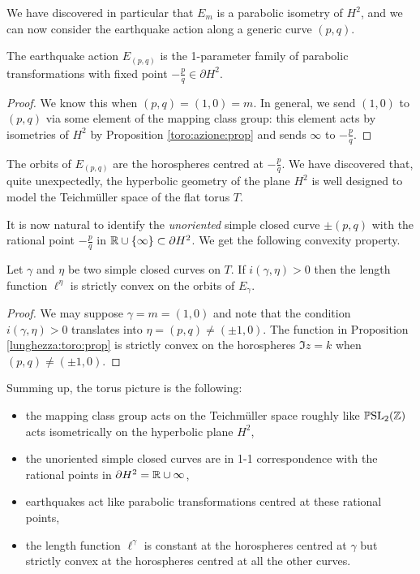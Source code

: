 We have discovered in particular that $E_m$ is a parabolic isometry of $H^2$, and we can now consider the earthquake action along a generic curve $(p,q)$.

\begin{cor} 
The earthquake action $E_{(p,q)}$ is the 1-parameter family of parabolic transformations with fixed point $-\frac pq \in \partial H^2$. 
\end{cor}
\begin{proof}
We know this when $(p,q)=(1,0)=m$. In general, we send $(1,0)$ to $(p,q)$ via some element of the mapping class group: this element acts by isometries of $H^2$ by Proposition \ref{toro:azione:prop} and sends $\infty$ to $-\frac pq$. 
\end{proof}

The orbits of $E_{(p,q)}$ are the horospheres centred at $-\frac pq$. 
We have discovered that, quite unexpectedly, the hyperbolic geometry of the plane $H^2$ is well designed to model the Teichm\"uller space of the flat torus $T$. 

It is now natural to identify the \emph{unoriented} simple closed curve $\pm (p,q)$ with the rational point $-\frac pq$ in $\mathbb{R}\cup\{\infty\} \subset \partial H^2$. We get the following convexity property.

\begin{cor} \label{convex:cor}
Let $\gamma$ and $\eta$ be two simple closed curves on $T$.
If $i(\gamma, \eta)>0$ then the length function $\ell^\eta$ is strictly convex on the orbits of $E_{\gamma}$.
\end{cor}
\begin{proof}
We may suppose $\gamma=m=(1,0)$ and note that the condition $i(\gamma,\eta)>0$ translates into $\eta = (p,q) \neq (\pm 1,0)$. The function in Proposition \ref{lunghezza:toro:prop} is strictly convex on the horospheres $\Im z = k$ when $(p,q)\neq (\pm 1,0)$.
\end{proof}

Summing up, the torus picture is the following: 
\begin{itemize}
\item the mapping class group acts on the Teichm\"uller space roughly like $\mathbb{P}{\rm SL}_2(\mathbb{Z})$ acts isometrically on the hyperbolic plane $H^2$, 
\item the unoriented simple closed curves are in 1-1 correspondence with the rational points in $\partial H^2 = \mathbb{R}\cup \infty$, 
\item earthquakes act like parabolic transformations centred at these rational points, \item the length function $\ell^\gamma$ is constant at the horospheres centred at $\gamma$ but strictly convex at the horospheres centred at all the other curves.
\end{itemize}

